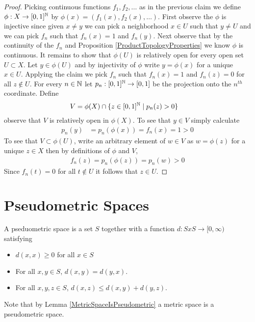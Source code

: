 \begin{proof}
Picking continuous functions $f_1, f_2, \dotsc$ as in the previous claim we define $\phi : X \to [0,1]^{\mathbb{N}}$ by $\phi(x) = (f_1(x), f_2(x), \dotsc)$.  First observe the $\phi$ is injective since given $x \neq y$ we can pick a neighborhood $x \in U$ such that $y \neq U$ and we can pick $f_n$ such that $f_n(x) = 1$ and $f_n(y)$.  Next observe that by the continuity of the $f_n$ and Proposition \ref{ProductTopologyProperties} we know $\phi$ is continuous.  It remains to show that $\phi(U)$ is relatively open for every open set $U \subset X$.  Let $y \in \phi(U)$ and by injectivity of $\phi$ write $y = \phi(x)$ for a unique $x \in U$.  Applying the claim we pick $f_n$ such that $f_n(x) = 1$ and $f_n(z)=0$ for all $z \notin U$.  For every $n \in \mathbb{N}$ let $p_n : [0,1]^{\mathbb{N}}  \to [0,1]$ be the projection onto the $n^{th}$ coordinate.  Define
\begin{align*}
V &= \phi(X) \cap \lbrace z \in [0,1]^{\mathbb{N}} \mid  p_n(z) > 0 \rbrace
\end{align*}
observe that $V$ is relatively open in $\phi(X)$. To see that $y \in V$ simply calculate
\begin{align*}
p_n(y) &= p_n(\phi(x)) = f_n(x) = 1 > 0
\end{align*}
To see that $V \subset \phi(U)$, write an arbitrary element of $w \in V$ as $w = \phi(z)$ for a unique $z \in X$ then by definitions of $\phi$ and $V$, 
\begin{align*}
f_n(z) = p_n(\phi(z)) = p_n(w) > 0
\end{align*}
Since $f_n(t)=0$ for all $t \notin U$ it follows that $z \in U$.
\end{proof}

\section{Pseudometric Spaces}

\begin{defn}A pseduometric space is a set $S$ together with a function
  $d:SxS \to [0,\infty)$ satisfying
\begin{itemize}
\item[(i)]$d(x,x) \geq 0$ for all $x \in S$
\item[(ii)]For all $x,y \in S$, $d(x,y) = d(y,x)$.
\item[(iii)]For all $x,y,z \in S$, $d(x,z) \leq d(x,y) + d(y,z)$.
\end{itemize}
\end{defn}

Note that by Lemma \ref{MetricSpaceIsPseudometric} a metric space is a
pseudometric space.  

